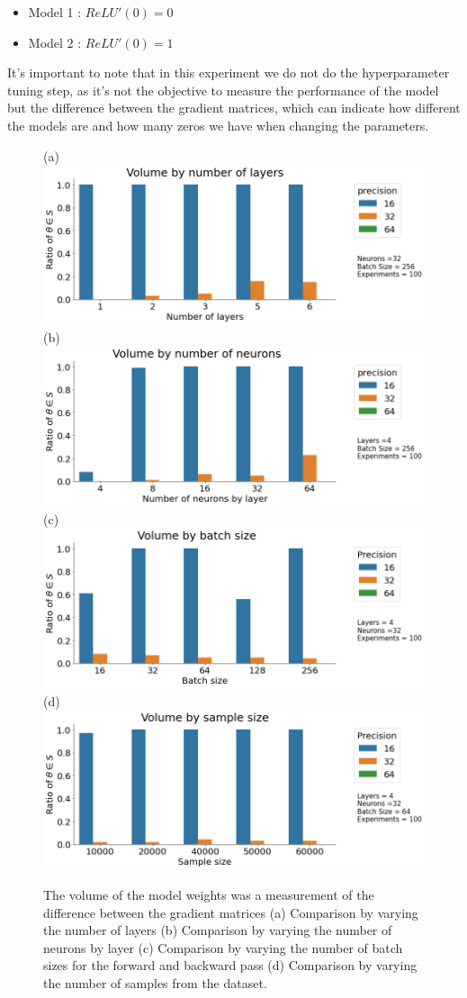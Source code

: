 \begin{itemize}
\item Model 1 : $ReLU'(0) = 0 $
\item Model 2 : $ReLU'(0) = 1$
\end{itemize}

It's important to note that in this experiment we do not do the hyperparameter tuning step, as it's not the objective to measure the performance of the model but the difference between the gradient matrices, which can indicate how different the models are and how many zeros we have when changing the parameters. 

\begin{figure}[htbp]
    \centering
        \subfigure(a){\includegraphics[width=0.4\columnwidth]{Images/Layers.png}} 
        \subfigure(b){\includegraphics[width=0.4\columnwidth]{Images/Neurons.png}} 
        \subfigure(c){\includegraphics[width=0.4\columnwidth]{Images/Batch.png}}
        \subfigure(d){\includegraphics[width=0.4\columnwidth]{Images/Sample}}
    \caption{The volume of the model weights was a measurement of the difference between the gradient matrices (a) Comparison by varying the number of layers   (b) Comparison by varying the number of neurons by layer (c) Comparison by varying the number of batch sizes for the forward and backward pass (d) Comparison by varying the number of samples from the dataset. }
    \label{fig:Volumes}
\end{figure}


